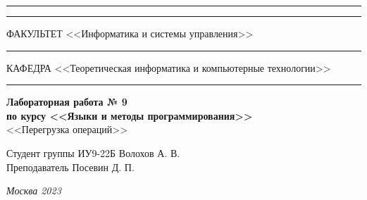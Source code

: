 \documentclass[a4paper, 14pt]{extarticle}
\begin{document}
\begin{titlepage}
\vspace{-25pt}
\hspace{-35pt}\rule{\textwidth}{2.3pt}

\vspace*{-20.3pt}
\hspace{-35pt}\rule{\textwidth}{0.4pt}

\vspace{1.5ex}
\hspace{-35pt} \noindent \small ФАКУЛЬТЕТ\hspace{80pt} <<Информатика и системы управления>>

\vspace*{-16pt}
\hspace{47pt}\rule{0.83\textwidth}{0.4pt}

\vspace{0.5ex}
\hspace{-35pt} \noindent \small КАФЕДРА\hspace{50pt} <<Теоретическая информатика и компьютерные технологии>>

\vspace*{-16pt}
\hspace{30pt}\rule{0.866\textwidth}{0.4pt}
  
\vspace{11em}

\begin{center}
\Large {\bf Лабораторная работа № 9} \\ 
\large {\bf по курсу <<Языки и методы программирования>>} \\
\large <<Перегрузка операций>> 
\end{center}\normalsize

\vspace{8em}


\begin{flushright}
  {Студент группы ИУ9-22Б Волохов А. В. \hspace*{15pt}\\ 
  \vspace{2ex}
  Преподаватель Посевин Д. П.\hspace*{15pt}}
\end{flushright}

\bigskip

\vfill
 

\begin{center}
\textsl{Москва 2023}
\end{center}
\end{titlepage}
\end{document}
